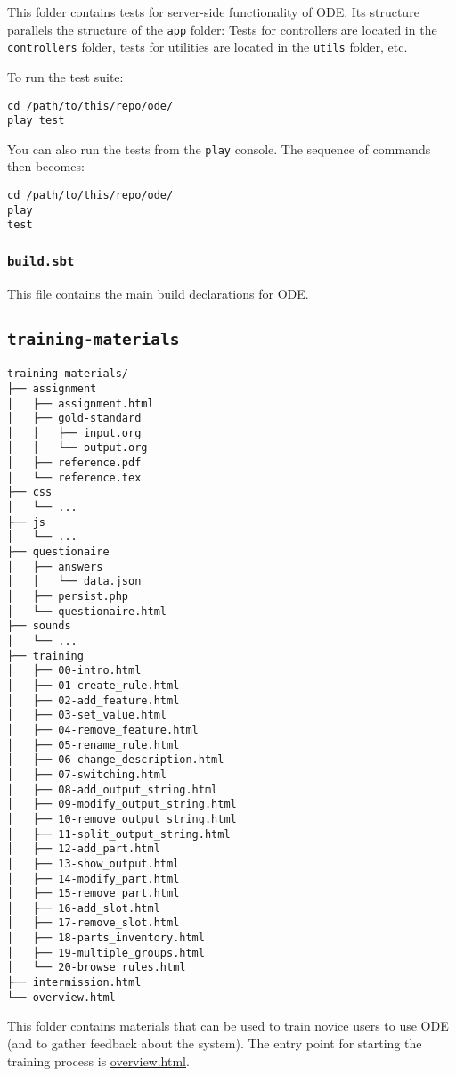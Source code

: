 \documentclass[11pt]{article}
\begin{document}
This folder contains tests for server-side functionality of ODE.
Its structure parallels the structure of the \texttt{app} folder: Tests
for controllers are located in the \texttt{controllers} folder, tests for
utilities are located in the \texttt{utils} folder, etc.

To run the test suite:

\begin{verbatim}
cd /path/to/this/repo/ode/
play test
\end{verbatim}

You can also run the tests from the \texttt{play} console. The sequence
of commands then becomes:

\begin{verbatim}
cd /path/to/this/repo/ode/
play
test
\end{verbatim}

\subsubsection{\texttt{build.sbt}}
\label{sec-3-3-7}
This file contains the main build declarations for ODE.

\subsection{\texttt{training-materials}}
\label{sec-3-4}
\begin{verbatim}
training-materials/
├── assignment
│   ├── assignment.html
│   ├── gold-standard
│   │   ├── input.org
│   │   └── output.org
│   ├── reference.pdf
│   └── reference.tex
├── css
│   └── ...
├── js
│   └── ...
├── questionaire
│   ├── answers
│   │   └── data.json
│   ├── persist.php
│   └── questionaire.html
├── sounds
│   └── ...
├── training
│   ├── 00-intro.html
│   ├── 01-create_rule.html
│   ├── 02-add_feature.html
│   ├── 03-set_value.html
│   ├── 04-remove_feature.html
│   ├── 05-rename_rule.html
│   ├── 06-change_description.html
│   ├── 07-switching.html
│   ├── 08-add_output_string.html
│   ├── 09-modify_output_string.html
│   ├── 10-remove_output_string.html
│   ├── 11-split_output_string.html
│   ├── 12-add_part.html
│   ├── 13-show_output.html
│   ├── 14-modify_part.html
│   ├── 15-remove_part.html
│   ├── 16-add_slot.html
│   ├── 17-remove_slot.html
│   ├── 18-parts_inventory.html
│   ├── 19-multiple_groups.html
│   └── 20-browse_rules.html
├── intermission.html
└── overview.html
\end{verbatim}

This folder contains materials that can be used to train novice
users to use ODE (and to gather feedback about the system). The
entry point for starting the training process is \href{training-materials/overview.html}{overview.html}.
\end{document}

